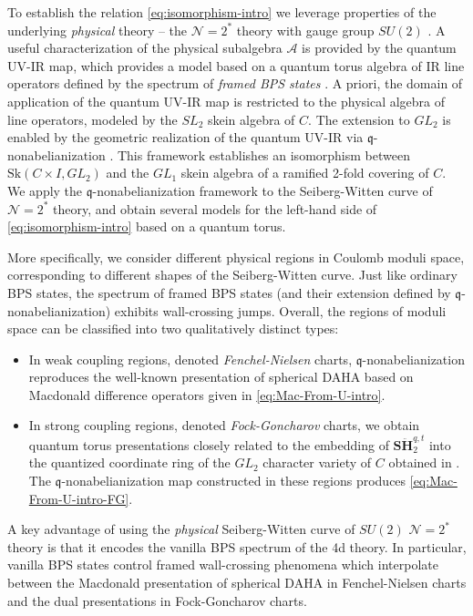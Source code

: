 \documentclass{article}
\numberwithin{equation}{section}
\newcommand{\mq}{\mathfrak{q}}
\newcommand{\Sk}{\mathrm{Sk}}
\def\CA{\mathcal{A}}
\def\CN{{\mathcal{N}}}
\newcommand{\SH}{{\mathbf{S}\ddot{\mathbf{H}}}}
\begin{document}
To establish the relation \eqref{eq:isomorphism-intro} we leverage properties of the underlying \textit{physical} theory -- the $\CN=2^*$ theory with gauge group $SU(2)$ \cite{Gaiotto:2009gz}.
A useful characterization of the physical subalgebra $\CA$ is provided by the quantum UV-IR map, which provides a model based on a quantum torus algebra of IR line operators defined by the spectrum of \emph{framed BPS states} \cite{Gaiotto:2010be}.
A priori, the domain of application of the quantum UV-IR map is restricted to the physical algebra of line operators, modeled by the $SL_2$ skein algebra of $C$. 
The extension to $GL_2$ is enabled by the geometric realization of the quantum UV-IR via $\mq$-nonabelianization \cite{Neitzke:2020jik}.
This framework establishes an isomorphism between $\Sk(C\times I, GL_2) $ and the $GL_1$ skein algebra of a ramified 2-fold covering of $C$.
We apply the $\mq$-nonabelianization framework to the Seiberg-Witten curve of $\CN=2^*$ theory, and obtain several models for the left-hand side of \eqref{eq:isomorphism-intro} based on a quantum torus.

More specifically, we consider different physical regions in Coulomb moduli space, corresponding to different shapes of the Seiberg-Witten curve.
Just like ordinary BPS states, the spectrum of framed BPS states (and their extension defined by $\mq$-nonabelianization) exhibits wall-crossing jumps. 
Overall, the regions of moduli space can be classified into two qualitatively distinct types:
\begin{itemize}
\item
In weak coupling regions, denoted \textit{Fenchel-Nielsen} charts, $\mq$-nonabelianization reproduces the well-known presentation of spherical DAHA based on Macdonald difference operators given in \eqref{eq:Mac-From-U-intro}.
\item
In strong coupling regions, denoted \textit{Fock-Goncharov} charts, we obtain quantum torus presentations closely related to the embedding of $\SH_2^{q,t}$ into the quantized coordinate ring of the $GL_2$ character variety of $C$ obtained in \cite{di2024ruijsenaars}. The $\mq$-nonabelianization map constructed in these regions produces \eqref{eq:Mac-From-U-intro-FG}.
\end{itemize}
A key advantage of using the \textit{physical} Seiberg-Witten curve of $SU(2)$ $\CN=2^*$ theory is that it encodes the vanilla BPS spectrum of the 4d theory. In particular, vanilla BPS states control framed wall-crossing phenomena which interpolate between the Macdonald presentation of spherical DAHA in Fenchel-Nielsen charts and the dual presentations in Fock-Goncharov charts. 
\end{document}
